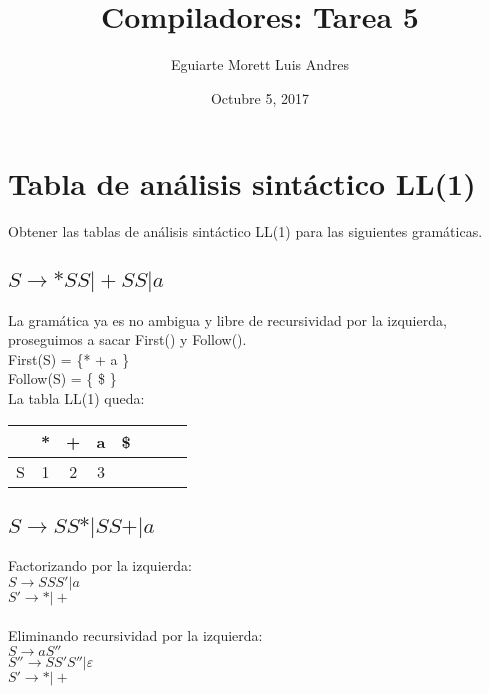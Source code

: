 \documentclass[11pt]{article} %
\title{Compiladores: Tarea 5}
\author{Eguiarte Morett Luis Andres}
\date{Octubre 5, 2017} %
\begin{document}
\maketitle

\section{Tabla de análisis sintáctico LL(1)}

Obtener las tablas de análisis sintáctico LL(1) para las siguientes gramáticas.

\subsection{$S\rightarrow*SS\vert+SS\vert a$}

La gramática ya es no ambigua y libre de recursividad por la izquierda, proseguimos a sacar First() y Follow().
\\

First(S) = \{* + a \} \\
Follow(S) = \{ \$ \} \\

La tabla LL(1) queda: \\

\begin{tabular}{l*{6}{c}r}
              & * & + & a & \$ \\
\hline
S & 1 & 2 & 3 &     \\
\end{tabular}

\subsection{$S\rightarrow SS*\vert SS+\vert a$}

Factorizando por la izquierda: \\
$S \rightarrow SSS' \vert a$ \\
$S' \rightarrow * \vert + $ \\
\\
Eliminando recursividad por la izquierda: \\
$S \rightarrow aS''$ \\
$S'' \rightarrow SS'S'' \vert \varepsilon$ \\
$S' \rightarrow * \vert +$
\\
\end{document}
